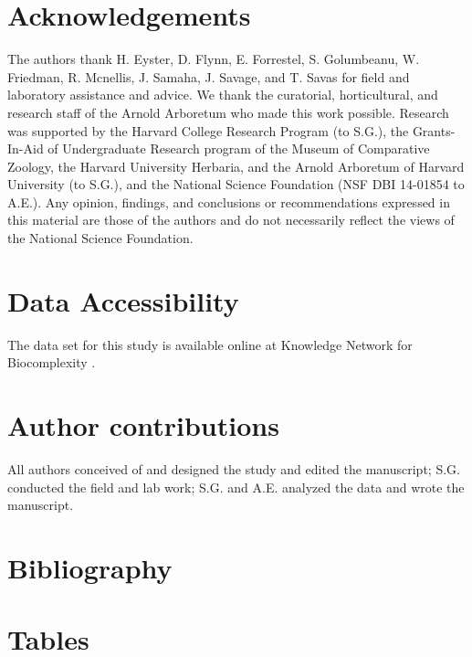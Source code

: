 \documentclass{article}
\begin{document}
\section*{Acknowledgements}
The authors thank H. Eyster, D. Flynn, E. Forrestel, S. Golumbeanu, W. Friedman, R. Mcnellis, J. Samaha, J. Savage, and T. Savas for field and laboratory assistance and advice. We thank the curatorial, horticultural, and research staff of the Arnold Arboretum who made this work possible. Research was supported by the Harvard College Research Program (to S.G.), the Grants-In-Aid of Undergraduate Research program of the Museum of Comparative Zoology, the Harvard University Herbaria, and the Arnold Arboretum of Harvard University (to S.G.), and the National Science Foundation (NSF DBI 14-01854 to A.E.). Any opinion, findings, and conclusions or recommendations expressed in this material are those of the authors and do not necessarily reflect the views of the National Science Foundation.

\section*{Data Accessibility}
The data set for this study is available online at Knowledge Network for Biocomplexity \citep{gee2017}. 

\section*{Author contributions} All authors conceived of and designed the study and edited the manuscript; S.G. conducted the field and lab work; S.G. and A.E. analyzed the data and wrote the manuscript.

\section{Bibliography}


\section* {Tables}
\end{document}
